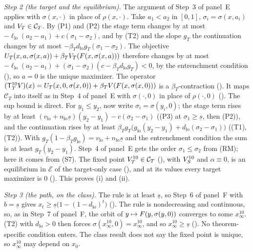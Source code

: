 \emph{Step 2 (the target and the equilibrium).} The argument of Step~3 of
panel~E applies with $\sigma(x,\cdot)$ in place of $\rho(x,\cdot)$. Take
$a_1<a_2$ in $[0,1]$, $\sigma_i=\sigma(x,a_i)$ and $V_T\in\mathcal C_T$. By (P1)
and (P2) the stage term changes by at most
$-\ell_{\mathrm{lo}}(a_2-a_1)+c(\sigma_1-\sigma_2)$, and by (T2) and the slope
$g_T$ the continuation changes by at most
$-\beta_Td_{\mathrm{lo}}g_T(\sigma_1-\sigma_2)$. The objective
$U_T(x,a,\sigma(x,a))+\beta_TV_T(F(x,\sigma(x,a)))$ therefore changes by at most
$-\ell_{\mathrm{lo}}(a_2-a_1)+(\sigma_1-\sigma_2)(c-\beta_Td_{\mathrm{lo}}g_T)<0$,
by the entrenchment condition (), so $a=0$ is the unique
maximizer. The operator
$(\mathsf T_T^{10}V)(x)=U_T(x,0,\sigma(x,0))+\beta_TV(F(x,\sigma(x,0)))$ is a
$\beta_T$-contraction (). It maps $\mathcal C_T$
into itself as in Step~4 of panel~E with $\sigma(\cdot,0)$ in place of
$\rho(\cdot,0)$ (). The sup bound is direct. For
$y_1\le y_2$, now write $\sigma_i=\sigma(y_i,0)$; the stage term rises by at least
$(v_{\mathrm{lo}}+n_{\mathrm{lo}}\underline s)(y_2-y_1)-c(\sigma_2-\sigma_1)$
((P3) at $\sigma_1\ge\underline s$, then (P2)), and the continuation rises by at
least
$\beta_Tg_T\bigl(g_{\mathrm{lo}}(y_2-y_1)+d_{\mathrm{lo}}(\sigma_2-\sigma_1)\bigr)$
((T1), (T2)). With $g_T(1-\beta_Tg_{\mathrm{lo}})=v_{\mathrm{lo}}+n_{\mathrm{lo}}\underline s$
and the entrenchment condition the sum is at least $g_T(y_2-y_1)$. Step~4 of panel~E gets
the order $\sigma_1\le\sigma_2$ from (RM); here it comes from (S7). The fixed
point $V_T^{10}\in\mathcal C_T$ (), with $V_S^{10}$ and
$\alpha\equiv0$, is an equilibrium in $\mathcal E$ of the target-only case
(), and at its values every target maximizer is
$0$ (). This proves (i) and (ii).

\emph{Step 3 (the path, on the class).} The rule is at least $\underline s$, so
Step~6 of panel~F with $b=\underline s$ gives
$x_t\ge\underline s\bigl(1-(1-d_{\mathrm{lo}})^t\bigr)$
(). The rule is nondecreasing and continuous,
so, as in Step~7 of panel~F, the orbit of $y\mapsto F(y,\sigma(y,0))$ converges
to some $x^{10}_\infty$. (T2) with $d_{\mathrm{lo}}>0$ then forces
$\sigma(x^{10}_\infty,0)=x^{10}_\infty$, and so $x^{10}_\infty\ge\underline s$
(). No theorem-specific condition enters. The class
result does not say the fixed point is unique, so $x^{10}_\infty$ may depend on $x_0$.

